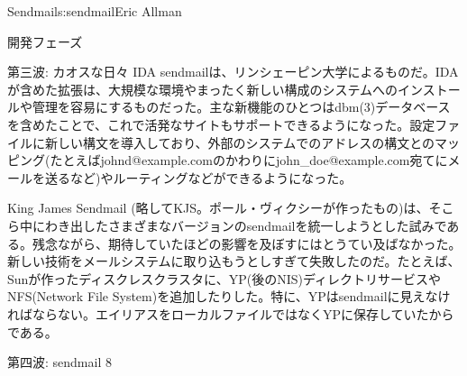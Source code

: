 \begin{aosachapter}{Sendmail}{s:sendmail}{Eric Allman}
\begin{aosasect1}{開発フェーズ}
\begin{aosasect2}{第三波: カオスな日々}
IDA sendmailは、リンシェーピン大学によるものだ。IDAが含めた拡張は、大規模な環境やまったく新しい構成のシステムへのインストールや管理を容易にするものだった。主な新機能のひとつはdbm(3)データベースを含めたことで、これで活発なサイトもサポートできるようになった。設定ファイルに新しい構文を導入しており、外部のシステムでのアドレスの構文とのマッピング(たとえばjohnd@example.comのかわりにjohn\_doe@example.com宛てにメールを送るなど)やルーティングなどができるようになった。

King James Sendmail (略してKJS。ポール・ヴィクシーが作ったもの)は、そこら中にわき出したさまざまなバージョンのsendmailを統一しようとした試みである。残念ながら、期待していたほどの影響を及ぼすにはとうてい及ばなかった。新しい技術をメールシステムに取り込もうとしすぎて失敗したのだ。たとえば、Sunが作ったディスクレスクラスタに、YP(後のNIS)ディレクトリサービスやNFS(Network File System)を追加したりした。特に、YPはsendmailに見えなければならない。エイリアスをローカルファイルではなくYPに保存していたからである。

\end{aosasect2}

\begin{aosasect2}{第四波: sendmail 8}


\end{aosasect2}
\end{aosasect1}
\end{aosachapter}
